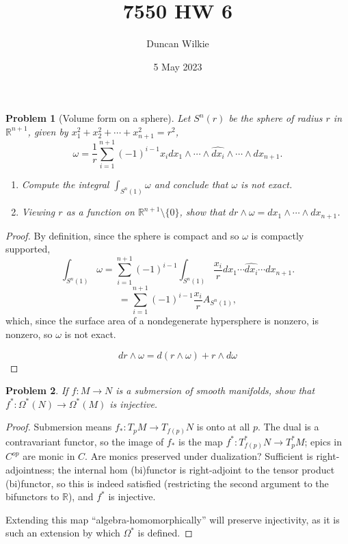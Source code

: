 \documentclass{article}
\title{7550 HW 6}
\author{Duncan Wilkie}
\date{5 May 2023}
\newtheorem{plm}{Problem}
\begin{document}
\maketitle

\begin{plm}[Volume form on a sphere]
  Let $S^{n}(r)$ be the sphere of radius $r$ in $\mathbb{R}^{n+1}$, given by $x_{1}^{2} + x_{2}^{2} + \cdots + x_{n+1}^{2} = r^{2}$,
  \[
    \omega = \frac{1}{r}\sum_{i = 1}^{n+1}(-1)^{i-1}x_{i}dx_{1} \wedge \cdots \wedge \widehat{dx_{i}} \wedge \cdots \wedge dx_{n+1}.
  \]
  \begin{enumerate}
  \item Compute the integral $\int_{S^{n}(1)}\omega$ and conclude that $\omega$ is not exact.
  \item Viewing $r$ as a function on $\mathbb{R}^{n+1} \setminus \{0\}$, show that $dr \wedge \omega = dx_{1} \wedge \cdots \wedge dx_{n+1}$.
  \end{enumerate}
\end{plm}

\begin{proof}
  By definition, since the sphere is compact and so $\omega$ is compactly supported,
  \[
    \int_{S^{n}(1)}\omega = \sum_{i = 1}^{n+1}(-1)^{i-1}\int_{S^{n}(1)}\frac{x_{i}}{r}dx_{1} \cdots \widehat{dx_{i}} \cdots dx_{n+1}.
  \]
  \[
    = \sum_{i = 1}^{n+1}(-1)^{i-1}\frac{x_{i}}{r}A_{S^{n}(1)},
  \]
  which, since the surface area of a nondegenerate hypersphere is nonzero, is nonzero, so $\omega$ is not exact.

  \[
    dr \wedge \omega = d(r \wedge \omega) + r \wedge d\omega
  \]

\end{proof}

\begin{plm}
  If $f: M \to N$ is a submersion of smooth manifolds, show that $f^{*}: \Omega^{*}(N) \to \Omega^{*}(M)$ is injective.
\end{plm}

\begin{proof}
  Submersion means $f_{*}: T_{p}M \to T_{f(p)}N$ is onto at all $p$.
  The dual is a contravariant functor, so the image of $f_{*}$ is the map $f^{*}: T_{f(p)}^{*}N \to T_{p}^{*}M$; epics in $C^{op}$
  are monic in $C$.
  Are monics preserved under dualization?
  Sufficient is right-adjointness; the internal hom (bi)functor is right-adjoint to the tensor product (bi)functor,
  so this is indeed satisfied (restricting the second argument to the bifunctors to $\mathbb{R}$), and $f^{*}$ is injective.

  Extending this map ``algebra-homomorphically'' will preserve injectivity, as it is such an extension by which $\Omega^{*}$ is defined.
\end{proof}
\end{document}
